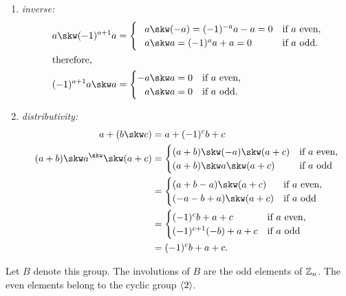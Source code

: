 \begin{xmpls}
\begin{enumerate}[\rm a)]
\begin{enumerate}[-]
        \item \textit{inverse:}
            \begin{align*}
                a\skw(-1)^{a+1}a &= 
                    \begin{cases}
                        \hphantom-a\skw(-a)=(-1)^{-a}a-a=0
                            &\text{if }a\text{ even},\\
                        \hphantom-a\skw a= (-1)^aa+a =0
                            &\text{if }a \text{ odd}.
                    \end{cases}\\
            \intertext{therefore,}
                (-1)^{a+1}a\skw a &=
                    \begin{cases}
                        -a\skw a = 0    &\text{if $a$ even},\\
                        \hphantom-a\skw a = 0    &\text{if $a$ odd.}
                    \end{cases}
            \end{align*}
        \item \textit{distributivity:}
            \begin{align*}
                a+(b\skw c) &= a+(-1)^cb + c\\
                (a+b)\skw a^\skw\skw(a+c)
                    &= \begin{cases}
                        (a+b)\skw(-a)\skw(a+c)  &\text{if $a$ even},\\
                        (a+b)\skw a\skw(a+c)    &\text{if $a$ odd}
                    \end{cases}\\
                    &= \begin{cases}
                        (a+b-a)\skw(a+c)    &\text{if $a$ even},\\
                        (-a-b+a)\skw(a+c)   &\text{if $a$ odd}
                    \end{cases}\\
                    &= \begin{cases}
                        (-1)^cb+a+c     &\text{if $a$ even},\\
                        (-1)^{c+1}(-b)+a+c  &\text{if $a$ odd}
                    \end{cases}\\
                    &= (-1)^cb + a + c.
            \end{align*}
    \end{enumerate}
    Let $B$ denote this group. The involutions of $B$ are the odd elements of $\mathbb{Z}_n$. The even elements belong to the cyclic group $\langle2\rangle$.


\end{enumerate}
\end{xmpls}
